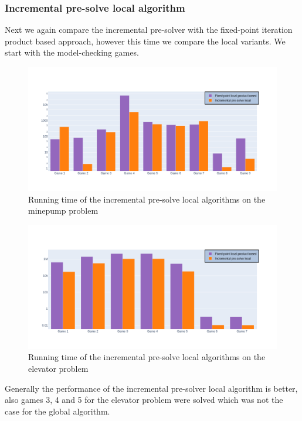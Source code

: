 \subsubsection{Incremental pre-solve local algorithm}
Next we again compare the incremental pre-solver with the fixed-point iteration product based approach, however this time we compare the local variants. We start with the model-checking games.
\begin{figure}[H]
	\includegraphics[width=1\linewidth]{"results/minepump/Fixed-point local product based_Incremental pre-solve local_"}
	\caption{Running time of the incremental pre-solve local algorithms on the minepump problem}
	\label{fig:minepumpzlnks}
\end{figure}%
\begin{figure}[H]
	\includegraphics[width=1\linewidth]{"results/elevator/Fixed-point local product based_Incremental pre-solve local_"}
	\caption{Running time of the incremental pre-solve local algorithms on the elevator problem}
	\label{fig:elevatorzlnks}
\end{figure}%
Generally the performance of the incremental pre-solver local algorithm is better, also games 3, 4 and 5 for the elevator problem were solved which was not the case for the global algorithm.

